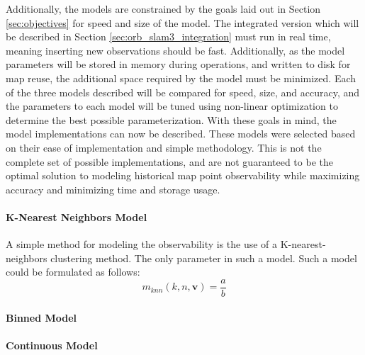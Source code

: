 Additionally, the models are constrained by the goals laid out in Section \ref{sec:objectives} for speed and size of the model. The integrated version which will be described in Section \ref{sec:orb_slam3_integration} must run in real time, meaning inserting new observations should be fast. Additionally, as the model parameters will be stored in memory during operations, and written to disk for map reuse, the additional space required by the model must be minimized. Each of the three models described will be compared for speed, size, and accuracy, and the parameters to each model will be tuned using non-linear optimization to determine the best possible parameterization. With these goals in mind, the model implementations can now be described. These models were selected based on their ease of implementation and simple methodology. This is not the complete set of possible implementations, and are not guaranteed to be the optimal solution to modeling historical map point observability while maximizing accuracy and minimizing time and storage usage.

\paragraph{K-Nearest Neighbors Model}
A simple method for modeling the observability is the use of a K-nearest-neighbors clustering method. The only parameter in such a model. Such a model could be formulated as follows:
$$
    m_{knn}(k, n, \boldsymbol{v}) = \frac{a}{b}
$$
\paragraph{Binned Model}
\paragraph{Continuous Model}